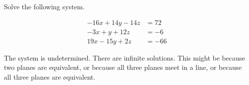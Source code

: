 
\begin{question}
Solve the following system.

\[\begin{aligned}
- 16 x + 14 y - 14 z&=72\\
- 3 x + y + 12 z&=-6\\
19 x - 15 y + 2 z&=-66
\end{aligned}\]
\end{question}

\begin{solution}
The system is undetermined. There are infinite solutions. This might be
because two planes are equivalent, or because all three planes meet in a
line, or because all three planes are equivalent.
\end{solution}

